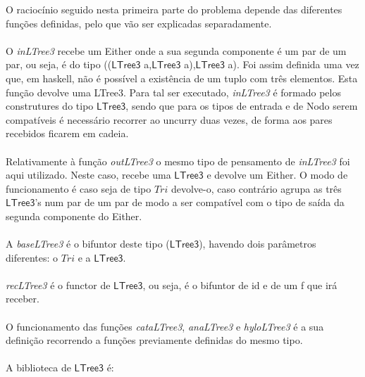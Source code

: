 \documentclass[a4paper]{article}
\newcommand{\Conid}[1]{\mathit{#1}}
\begin{document}
O raciocínio seguido nesta primeira parte do problema depende das diferentes funções definidas, pelo que vão ser explicadas separadamente.
\\
\\
O \emph{inLTree3} recebe um Either onde a sua segunda componente é um par de um par, ou 
seja, é do tipo ((\ensuremath{\mathsf{LTree3}} a,\ensuremath{\mathsf{LTree3}} a),\ensuremath{\mathsf{LTree3}} a). Foi assim definida uma vez que, 
em haskell, não é possível a existência de um tuplo com três elementos. Esta 
função devolve uma LTree3. Para tal ser executado, \emph{inLTree3} é formado 
pelos construtures do tipo \ensuremath{\mathsf{LTree3}}, sendo que para os tipos de entrada e de Nodo 
serem compatíveis é necessário recorrer ao uncurry duas vezes, de forma aos pares 
recebidos ficarem em cadeia.
\\
\\
Relativamente à função \emph{outLTree3} o mesmo tipo de pensamento de \emph{inLTree3} foi aqui utilizado. Neste caso, recebe uma \ensuremath{\mathsf{LTree3}} e devolve um Either. O modo de funcionamento é caso seja de tipo \ensuremath{\Conid{Tri}} devolve-o, caso contrário agrupa as três \ensuremath{\mathsf{LTree3}}'s num par de um par de modo a ser compatível com o tipo de saída da segunda componente do Either.
\\
\\
A \emph{baseLTree3} é o bifuntor deste tipo (\ensuremath{\mathsf{LTree3}}), havendo dois parâmetros diferentes: o \ensuremath{\Conid{Tri}} e a \ensuremath{\mathsf{LTree3}}.
\\
\\
\emph{recLTree3} é o functor de \ensuremath{\mathsf{LTree3}}, ou seja, é o bifuntor de id e de um f que 
irá receber.
\\
\\
O funcionamento das funções \emph{cataLTree3}, \emph{anaLTree3} e \emph{hyloLTree3
} é a sua definição recorrendo a funções previamente definidas do mesmo tipo.
\\
\\
A biblioteca de \ensuremath{\mathsf{LTree3}} é:
\end{document}
